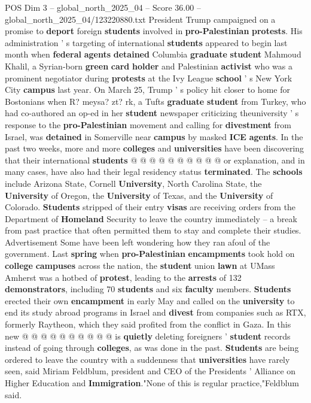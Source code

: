 \begin{textsample}{POS Dim 3 – global\_north\_2025\_04 – Score 36.00 – global\_north\_2025\_04/123220880.txt}
President Trump campaigned on a promise to \textbf{deport} foreign \textbf{students} involved in \textbf{pro-Palestinian} \textbf{protests}.
His administration ' s targeting of international \textbf{students} appeared to begin last month when \textbf{federal} \textbf{agents} \textbf{detained} Columbia \textbf{graduate} \textbf{student} Mahmoud Khalil, a Syrian-born \textbf{green} \textbf{card} \textbf{holder} and Palestinian \textbf{activist} who was a prominent negotiator during \textbf{protests} at the Ivy League \textbf{school} ' s New York City \textbf{campus} last year.
On March 25, Trump ' s policy hit closer to home for Bostonians when R? meysa? zt? rk, a Tufts \textbf{graduate} \textbf{student} from Turkey, who had co-authored an op-ed in her \textbf{student} newspaper criticizing theuniversity ' s response to the \textbf{pro-Palestinian} movement and calling for \textbf{divestment} from Israel, was \textbf{detained} in Somerville near \textbf{campus} by masked \textbf{ICE} \textbf{agents}.
In the past two weeks, more and more \textbf{colleges} and \textbf{universities} have been discovering that their international \textbf{students} @ @ @ @ @ @ @ @ @ @ or explanation, and in many cases, have also had their legal residency status \textbf{terminated}.
The \textbf{schools} include Arizona State, Cornell \textbf{University}, North Carolina State, the \textbf{University} of Oregon, the \textbf{University} of Texas, and the \textbf{University} of Colorado. \textbf{Students} stripped of their entry \textbf{visas} are receiving orders from the Department of \textbf{Homeland} Security to leave the country immediately -- a break from past practice that often permitted them to stay and complete their studies.
Advertisement Some have been left wondering how they ran afoul of the government.
Last \textbf{spring} when \textbf{pro-Palestinian} \textbf{encampments} took hold on \textbf{college} \textbf{campuses} across the nation, the \textbf{student} union \textbf{lawn} at UMass Amherst was a hotbed of \textbf{protest}, leading to the \textbf{arrests} of 132 \textbf{demonstrators}, including 70 \textbf{students} and six \textbf{faculty} members. \textbf{Students} erected their own \textbf{encampment} in early May and called on the \textbf{university} to end its study abroad programs in Israel and \textbf{divest} from companies such as RTX, formerly Raytheon, which they said profited from the conflict in Gaza.
In this new @ @ @ @ @ @ @ @ @ @ is \textbf{quietly} deleting foreigners ' \textbf{student} records instead of going through \textbf{colleges}, as was done in the past. \textbf{Students} are being ordered to leave the country with a suddenness that \textbf{universities} have rarely seen, said Miriam Feldblum, president and CEO of the Presidents ' Alliance on Higher Education and \textbf{Immigration}."None of this is regular practice,"Feldblum said.

\end{textsample}
